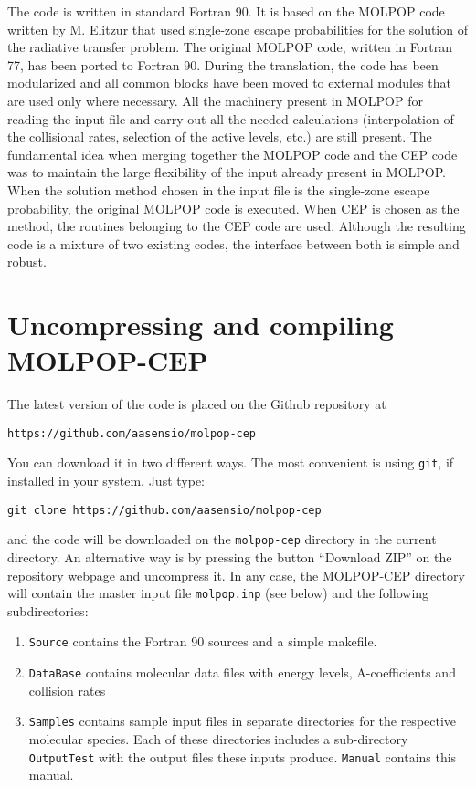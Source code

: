 \documentclass[12pt]{article}
\begin{document}
The code is written in standard Fortran 90. It is based on the MOLPOP code
written by M. Elitzur that used single-zone escape probabilities for the
solution of the radiative transfer problem. The original MOLPOP code, written
in Fortran 77, has been ported to Fortran 90. During the translation, the code
has been modularized and all common blocks have been moved to external modules
that are used only where necessary. All the machinery present in MOLPOP for
reading the input file and carry out all the needed calculations (interpolation
of the collisional rates, selection of the active levels, etc.) are still
present. The fundamental idea when merging together the MOLPOP code and the CEP
code was to maintain the large flexibility of the input already present in
MOLPOP. When the solution method chosen in the input file is the single-zone
escape probability, the original MOLPOP code is executed. When CEP is chosen as
the method, the routines belonging to the CEP code are used. Although the
resulting code is a mixture of two existing codes, the interface between both
is simple and robust.

\section{Uncompressing and compiling MOLPOP-CEP}

The latest version of the code is placed on the Github repository at
\begin{verbatim}
https://github.com/aasensio/molpop-cep
\end{verbatim}
You can download it
in two different ways. The most convenient is using \texttt{git}, if installed in
your system. Just type:
\begin{verbatim}
git clone https://github.com/aasensio/molpop-cep
\end{verbatim}
and the code will be downloaded on the \texttt{molpop-cep} directory in the
current directory. An alternative way is by pressing the button ``Download ZIP''
on the repository webpage and uncompress it. In any case, the MOLPOP-CEP directory
will contain the master input file \texttt{molpop.inp} (see below) and the
following subdirectories:

\begin{enumerate}
\item
{\tt Source} contains the Fortran 90 sources and a simple makefile.
\item
{\tt DataBase} contains molecular data files with energy levels,
A-coefficients and collision rates
\item
{\tt Samples} contains sample input files in separate directories for the
respective molecular species. Each of these directories includes a
sub-directory \texttt{OutputTest} with the output files these inputs produce.
{\tt Manual} contains this manual.
\end{enumerate}
\end{document}
